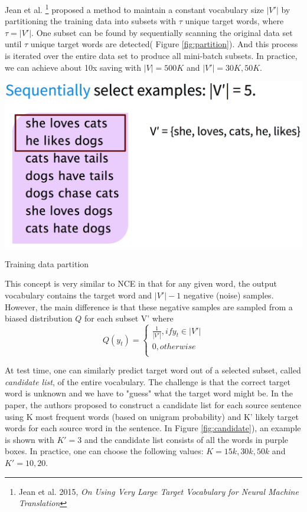 \documentclass{tufte-handout}
\begin{document}
Jean et al. \footnote{Jean et al. 2015, \textit{On Using Very
Large Target Vocabulary for Neural Machine Translation}} proposed a method to maintain a constant vocabulary size $|V'|$ by partitioning the training data into subsets with $\tau$ unique target words, where $\tau=|V'|$. One subset can be found by sequentially scanning the original data set until $\tau$ unique target words are detected( Figure \ref{fig:partition}). And this process is iterated over the entire data set to produce all mini-batch subsets. In practice, we can achieve about 10x saving with $|V|=500K$ and $|V'|=30K, 50K$.

\begin{marginfigure}
	\centering
	\includegraphics[width=0.9\linewidth]{partition.png}
	\caption {Training data partition}
	\label{fig:partition}
\end{marginfigure}

This concept is very similar to NCE in that for any given word, the output vocabulary contains the target word and $|V'|-1$ negative (noise) samples. However, the main difference is that these negative samples are sampled from a biased distribution $Q$ for each subset V' where
\[
  Q(y_t)=\begin{cases}
               \frac{1}{|V'|}, if y_t \in |V'|\\
               0, otherwise\\
            \end{cases}
\]

At test time, one can similarly predict target word out of a selected subset, called \textit{candidate list}, of the entire vocabulary. The challenge is that the correct target word is unknown and we have to "guess" what the target word might be. In the paper, the authors proposed to construct a candidate list for each source sentence using K most frequent words (based on unigram probability) and K' likely target words for each source word in the sentence. In Figure \ref{fig:candidate}), an example is shown with $K'=3$ and the candidate list consists of all the words in purple boxes. In practice, one can choose the following values: $K =15k,30k,50k$ and $K' = 10, 20$.
\end{document}
